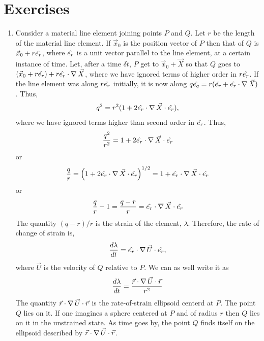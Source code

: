 \section{Exercises}\label{c2s11}
\begin{enumerate}
\item Consider a material line element joining points $P$ and $Q$. Let $r$ be the length of the material line element. If $\vec{x}_0$ is the position vector of $P$ then that of $Q$ is 
$\vec{x}_0 + r\hat{e_{r}}$, where $\hat{e_{r}}$ is a unit vector parallel to the line element, at a certain instance of time. Let, after a time $\delta t$, $P$ get to $\vec{x}_0 + \vec{X}$ so
 that $Q$ goes to $(\vec{x}_0 + r\hat{e_{r}}) + r\hat{e_{r}}\cdot\operatorname{\nabla}\vec{X}$, where we have ignored terms of higher order in $r\hat{e_{r}}$. If the line element was along $r\hat{e_{r}}$ 
initially, it is now along $q\hat{e_{q}} = r(\hat{e_{r}} + \hat{e_{r}}\cdot\operatorname{\nabla}\vec{X})$. Thus,
\[
q^2 = r^2(1 + 2\hat{e_{r}}\cdot\operatorname{\nabla}\vec{X}\cdot\hat{e_{r}}),
\]
where we have ignored terms higher than second order in $\hat{e_{r}}$. Thus,
\[
\frac{q^2}{r^2} = 1 + 2\hat{e_{r}}\cdot\operatorname{\nabla}\vec{X}\cdot\hat{e_{r}}
\]
or
\[
\frac{q}{r} = \left(1 + 2\hat{e_{r}}\cdot\operatorname{\nabla}\vec{X}\cdot\hat{e_{r}}\right)^{1/2} = 1 + \hat{e_{r}}\cdot\operatorname{\nabla}\vec{X}\cdot\hat{e_{r}}
\]
or
\[
\frac{q}{r} - 1 = \frac{q - r}{r} = \hat{e_{r}}\cdot\operatorname{\nabla}\vec{X}\cdot\hat{e_{r}}
\]
The quantity $(q - r)/r$ is the strain of the element, $\lambda$. Therefore, the rate of change of strain is,
\[
\frac{d{\lambda}}{d{t}} = \hat{e_{r}}\cdot\operatorname{\nabla}\vec{U}\cdot\hat{e_{r}},
\]
where $\vec{U}$ is the velocity of $Q$ relative to $P$. We can as well write it as
\[
\frac{d{\lambda}}{d{t}} = \frac{\vec{r}\cdot\operatorname{\nabla}\vec{U}\cdot\vec{r}}{r^2}
\]
The quantity $\vec{r}\cdot\operatorname{\nabla}\vec{U}\cdot\vec{r}$ is the rate-of-strain ellipsoid centerd at $P$. The point $Q$ lies on it. If one imagines a sphere centered at $P$ and of radius $r$ 
then $Q$ lies on it in the unstrained state. As time goes by, the point $Q$ finds itself on the ellipsoid described by $\vec{r}\cdot\operatorname{\nabla}\vec{U}\cdot\vec{r}$.


\end{enumerate}
